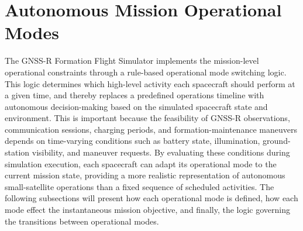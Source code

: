 \section{Autonomous Mission Operational Modes}
\label{sec:operational_mode_logic}
The GNSS-R Formation Flight Simulator implements the mission-level operational constraints through a rule-based operational mode switching logic. This logic determines which high-level activity each spacecraft should perform at a given time, and thereby replaces a predefined operations timeline with autonomous decision-making based on the simulated spacecraft state and environment. This is important because the feasibility of GNSS-R observations, communication sessions, charging periods, and formation-maintenance maneuvers depends on time-varying conditions such as battery state, illumination, ground-station visibility, and maneuver requests. By evaluating these conditions during simulation execution, each spacecraft can adapt its operational mode to the current mission state, providing a more realistic representation of autonomous small-satellite operations than a fixed sequence of scheduled activities. The following subsections will present how each operational mode is defined, how each mode effect the instantaneous mission objective, and finally, the logic governing the transitions between operational modes.

